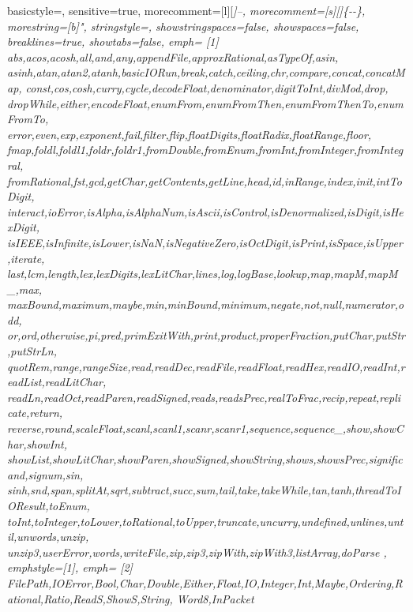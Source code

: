  {
        basicstyle=\ttfamily\footnotesize,
        sensitive=true,
        morecomment=[l][\color{hsk-comment}\ttfamily\itshape]{--},
        morecomment=[s][\color{hsk-comment}\ttfamily\itshape]{\{-}{-\}},
        morestring=[b]",
        stringstyle=\color{hsk-string},
        showstringspaces=false,
        showspaces=false,
        breaklines=true,
        showtabs=false,
        emph=
        {[1]
                abs,acos,acosh,all,and,any,appendFile,approxRational,asTypeOf,asin,
                asinh,atan,atan2,atanh,basicIORun,break,catch,ceiling,chr,compare,concat,concatMap,
                const,cos,cosh,curry,cycle,decodeFloat,denominator,digitToInt,divMod,drop,
                dropWhile,either,encodeFloat,enumFrom,enumFromThen,enumFromThenTo,enumFromTo,
                error,even,exp,exponent,fail,filter,flip,floatDigits,floatRadix,floatRange,floor,
                fmap,foldl,foldl1,foldr,foldr1,fromDouble,fromEnum,fromInt,fromInteger,fromIntegral,
                fromRational,fst,gcd,getChar,getContents,getLine,head,id,inRange,index,init,intToDigit,
                interact,ioError,isAlpha,isAlphaNum,isAscii,isControl,isDenormalized,isDigit,isHexDigit,
                isIEEE,isInfinite,isLower,isNaN,isNegativeZero,isOctDigit,isPrint,isSpace,isUpper,iterate,
                last,lcm,length,lex,lexDigits,lexLitChar,lines,log,logBase,lookup,map,mapM,mapM_,max,
                maxBound,maximum,maybe,min,minBound,minimum,negate,not,null,numerator,odd,
                or,ord,otherwise,pi,pred,primExitWith,print,product,properFraction,putChar,putStr,putStrLn,
                quotRem,range,rangeSize,read,readDec,readFile,readFloat,readHex,readIO,readInt,readList,readLitChar,
                readLn,readOct,readParen,readSigned,reads,readsPrec,realToFrac,recip,repeat,replicate,return,
                reverse,round,scaleFloat,scanl,scanl1,scanr,scanr1,sequence,sequence_,show,showChar,showInt,
                showList,showLitChar,showParen,showSigned,showString,shows,showsPrec,significand,signum,sin,
                sinh,snd,span,splitAt,sqrt,subtract,succ,sum,tail,take,takeWhile,tan,tanh,threadToIOResult,toEnum,
                toInt,toInteger,toLower,toRational,toUpper,truncate,uncurry,undefined,unlines,until,unwords,unzip,
                unzip3,userError,words,writeFile,zip,zip3,zipWith,zipWith3,listArray,doParse
        },
        emphstyle={[1]\color{hsk-built-ins}},
        emph=
        {[2]
                FilePath,IOError,Bool,Char,Double,Either,Float,IO,Integer,Int,Maybe,Ordering,Rational,Ratio,ReadS,ShowS,String, Word8,InPacket
}}
